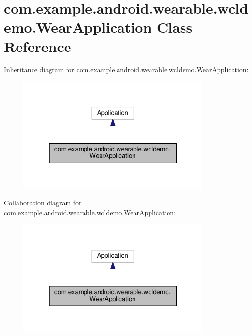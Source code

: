 \hypertarget{classcom_1_1example_1_1android_1_1wearable_1_1wcldemo_1_1WearApplication}{}\section{com.\+example.\+android.\+wearable.\+wcldemo.\+Wear\+Application Class Reference}
\label{classcom_1_1example_1_1android_1_1wearable_1_1wcldemo_1_1WearApplication}


Inheritance diagram for com.\+example.\+android.\+wearable.\+wcldemo.\+Wear\+Application\+:\nopagebreak
\begin{figure}[H]
\begin{center}
\leavevmode
\includegraphics[width=277pt]{d2/d98/classcom_1_1example_1_1android_1_1wearable_1_1wcldemo_1_1WearApplication__inherit__graph}
\end{center}
\end{figure}


Collaboration diagram for com.\+example.\+android.\+wearable.\+wcldemo.\+Wear\+Application\+:\nopagebreak
\begin{figure}[H]
\begin{center}
\leavevmode
\includegraphics[width=277pt]{d9/d05/classcom_1_1example_1_1android_1_1wearable_1_1wcldemo_1_1WearApplication__coll__graph}
\end{center}
\end{figure}
